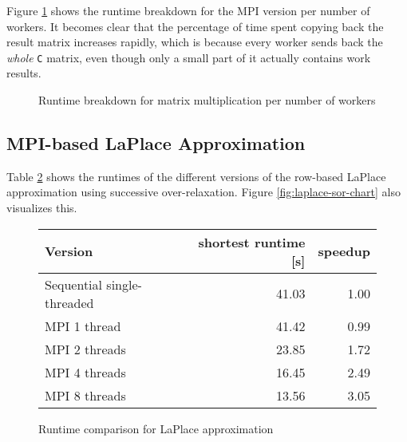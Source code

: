\documentclass[]{article}
\begin{document}
Figure \ref{fig:maxtrix-mult-chart} shows the runtime breakdown for the MPI version per number of workers. It becomes clear that the percentage of time spent copying back the result matrix increases rapidly, which is because every worker sends back the \emph{whole} \texttt{C} matrix, even though only a small part of it actually contains work results.

\begin{figure}[h]
	\centering
	\caption{Runtime breakdown for matrix multiplication per number of workers}
	\label{fig:maxtrix-mult-chart}
\end{figure}

\subsection{MPI-based LaPlace Approximation}

 Table \ref{tab:laplace-sor-runtime} shows the runtimes of the different versions of the row-based LaPlace approximation using successive over-relaxation. Figure \ref{fig:laplace-sor-chart} also visualizes this.

\begin{figure}[h]
	\centering
	\begin{tabular}{|l|r|r|}
		\hline
		\textbf{Version} & \textbf{shortest runtime [s]} & \textbf{speedup} \\
		\hline
		Sequential single-threaded	& 41.03 & 1.00 \\ 
		\hline 
		MPI 1 thread				& 41.42 & 0.99 \\ 
		\hline 
		MPI 2 threads				& 23.85 & 1.72 \\ 
		\hline 
		MPI 4 threads 				& 16.45 & 2.49 \\ 
		\hline 
		MPI 8 threads				& 13.56 & 3.05 \\ 
		\hline 
	\end{tabular} 
	\caption{Runtime comparison for LaPlace approximation}
	\label{tab:laplace-sor-runtime}
\end{figure}
\end{document}
